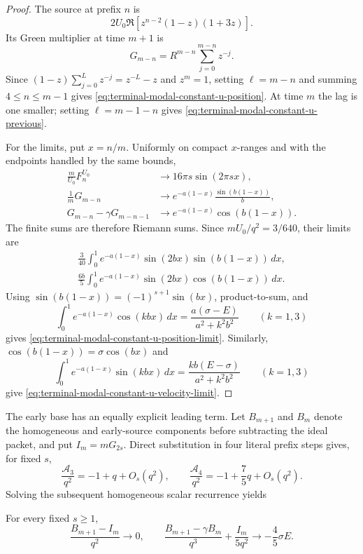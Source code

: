 \begin{proof}
The source at prefix $n$ is
\[
 2U_0\Re\left[z^{n-2}(1-z)(1+3z)\right].
\]
Its Green multiplier at time $m+1$ is
\[
 G_{m-n}=R^{m-n}\sum_{j=0}^{m-n}z^{-j}.
\]
Since $(1-z)\sum_{j=0}^Lz^{-j}=z^{-L}-z$ and $z^m=1$, setting
$\ell=m-n$ and summing $4\leq n\leq m-1$ gives
\eqref{eq:terminal-modal-constant-u-position}.  At time $m$ the lag is one
smaller; setting $\ell=m-1-n$ gives
\eqref{eq:terminal-modal-constant-u-previous}.

For the limits, put $x=n/m$.  Uniformly on compact $x$-ranges and with the
endpoints handled by the same bounds,
\begin{align*}
 \frac m{U_0}F_n^{U_0}&\longrightarrow
 16\pi s\sin(2\pi sx),\\
 \frac1mG_{m-n}&\longrightarrow
 e^{-a(1-x)}\frac{\sin(b(1-x))}{b},\\
 G_{m-n}-\gamma G_{m-n-1}&\longrightarrow
 e^{-a(1-x)}\cos(b(1-x)).
\end{align*}
The finite sums are therefore Riemann sums.  Since
$mU_0/q^2=3/640$, their limits are
\begin{align*}
 \frac3{40}\int_0^1e^{-a(1-x)}
 \sin(2bx)\sin(b(1-x))\,dx,\\
 \frac{6b}{5}\int_0^1e^{-a(1-x)}
 \sin(2bx)\cos(b(1-x))\,dx.
\end{align*}
Using $\sin(b(1-x))=(-1)^{s+1}\sin(bx)$, product-to-sum, and
\[
 \int_0^1e^{-a(1-x)}\cos(kbx)\,dx
 =\frac{a(\sigma-E)}{a^2+k^2b^2}\qquad(k=1,3)
\]
gives \eqref{eq:terminal-modal-constant-u-position-limit}.  Similarly,
$\cos(b(1-x))=\sigma\cos(bx)$ and
\[
 \int_0^1e^{-a(1-x)}\sin(kbx)\,dx
 =\frac{kb(E-\sigma)}{a^2+k^2b^2}\qquad(k=1,3)
\]
give
\eqref{eq:terminal-modal-constant-u-velocity-limit}.
\end{proof}

The early base has an equally explicit leading term.  Let $B_{m+1}$ and
$B_m$ denote the homogeneous and early-source components before subtracting
the ideal packet, and put $I_m=mG_{2s}$.  Direct substitution in four literal
prefix steps gives, for fixed $s$,
\begin{equation*}
 \frac{\mathcal A_3}{q^2}=-1+q+O_s(q^2),\qquad
 \frac{\mathcal A_4}{q^2}=-1+\frac75q+O_s(q^2).
\end{equation*}
Solving the subsequent homogeneous scalar recurrence yields
\begin{lemma}
\label{lem:terminal-modal-base-velocity-limit}
For every fixed $s\geq1$,
\begin{equation}
 \frac{B_{m+1}-I_m}{q^2}\longrightarrow0,\qquad
 \frac{B_{m+1}-\gamma B_m}{q^3}+\frac{I_m}{5q^2}
 \longrightarrow-\frac45\sigma E.
 \label{eq:terminal-modal-base-velocity-limit}
\end{equation}
\end{lemma}

